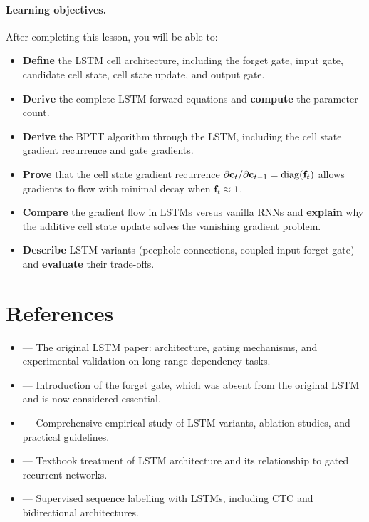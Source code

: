 \documentclass[11pt,a4paper]{article}
\begin{document}
\paragraph{Learning objectives.}
After completing this lesson, you will be able to:
\begin{itemize}[nosep]
  \item \textbf{Define} the LSTM cell architecture, including the
    forget gate, input gate, candidate cell state, cell state
    update, and output gate.
  \item \textbf{Derive} the complete LSTM forward equations and
    \textbf{compute} the parameter count.
  \item \textbf{Derive} the BPTT algorithm through the LSTM,
    including the cell state gradient recurrence and gate gradients.
  \item \textbf{Prove} that the cell state gradient recurrence
    $\partial \mathbf{c}_t / \partial \mathbf{c}_{t-1} =
    \operatorname{diag}(\mathbf{f}_t)$ allows gradients to flow with minimal
    decay when $\mathbf{f}_t \approx \mathbf{1}$.
  \item \textbf{Compare} the gradient flow in LSTMs versus vanilla
    RNNs and \textbf{explain} why the additive cell state update
    solves the vanishing gradient problem.
  \item \textbf{Describe} LSTM variants (peephole connections,
    coupled input-forget gate) and \textbf{evaluate} their
    trade-offs.
\end{itemize}

\section{References}
\label{sec:references}

\begin{itemize}
  \item \citet{hochreiter1997} --- The original LSTM paper:
    architecture, gating mechanisms, and experimental validation
    on long-range dependency tasks.
  \item \citet{gers2000} --- Introduction of the forget gate, which
    was absent from the original LSTM and is now considered essential.
  \item \citet{greff2017} --- Comprehensive empirical study of LSTM
    variants, ablation studies, and practical guidelines.
  \item \citet[Chapter~10]{goodfellow2016} --- Textbook treatment of
    LSTM architecture and its relationship to gated recurrent
    networks.
  \item \citet{graves2012} --- Supervised sequence labelling with
    LSTMs, including CTC and bidirectional architectures.
\end{itemize}
\end{document}
